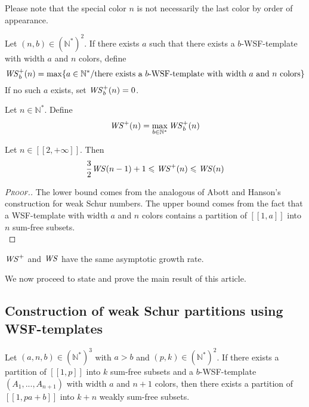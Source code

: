 Please note that the special color \(n\) is not necessarily the last color by order of appearance.

\begin{definition}
Let \( (n,b) \in (\mathbb{N}^*)^2\). If there exists \(a\) such that there exists a \(b\)-WSF-template with width \(a\) 
and \(n\) colors, define
\[
\mathit{WS}_b^+(n)= \max \{a \in \mathbb{N}^*/ \text{there exists a } b \text{-WSF-template with width } a \text{ and } n \text{ colors} \}
\]
If no such \(a\) exists, set \(\mathit{WS}_b^+(n) = 0\).
\end{definition}

\begin{definition}
Let \( n \in \mathbb{N}^*\). Define 
\[
\mathit{WS}^+(n)=\max_{b\in \mathbb{N}^*} \mathit{WS}_b^+(n)
\]
\end{definition}

\begin{proposition}
Let \(n \in [\![2, +\infty]\!]\). Then
\[
\frac{3}{2} \mathit{WS} (n-1)+1 \leqslant \mathit{WS}^+(n) \leqslant \mathit{WS} (n)
\]
\end{proposition}

\begin{proof}[\textsc{Proof.}]
The lower bound comes from the analogous of Abott and Hanson's construction for weak Schur numbers.
The upper bound comes from the fact that a WSF-template with width \(a\) and \(n\) colors contains a partition of
\([\![1, a]\!]\) into \(n\) sum-free subsets. \\
\end{proof}

\begin{remark}
\(\mathit{WS}^+\) and \(\mathit{WS}\) have the same asymptotic growth rate.
\end{remark}

We now proceed to state and prove the main result of this article.


\subsection{Construction of weak Schur partitions using WSF-templates}

\begin{theorem}
Let \((a,n,b) \in (\mathbb{N}^*)^3\) with \(a > b\) and \( (p,k) \in (\mathbb{N}^*)^2\). If there exists a partition of \([\![1,p]\!]\) 
into \(k\) sum-free subsets and a \(b\)-WSF-template \((A_1,...,A_{n+1})\) with width \(a\) and \(n+1\) colors, 
then there exists a partition of \([\![1, p a + b]\!]\) into \(k+n\) weakly sum-free subsets.
\end{theorem}

